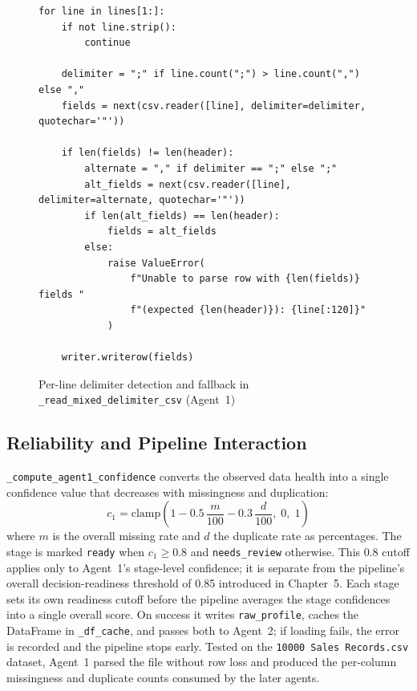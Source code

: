 \documentclass[12pt,a4paper,openany]{report}
\begin{document}
\begin{figure}[H]
\centering
\begin{lstlisting}[style=pystyle]
for line in lines[1:]:
    if not line.strip():
        continue

    delimiter = ";" if line.count(";") > line.count(",") else ","
    fields = next(csv.reader([line], delimiter=delimiter, quotechar='"'))

    if len(fields) != len(header):
        alternate = "," if delimiter == ";" else ";"
        alt_fields = next(csv.reader([line], delimiter=alternate, quotechar='"'))
        if len(alt_fields) == len(header):
            fields = alt_fields
        else:
            raise ValueError(
                f"Unable to parse row with {len(fields)} fields "
                f"(expected {len(header)}): {line[:120]}"
            )

    writer.writerow(fields)
\end{lstlisting}
\caption{Per-line delimiter detection and fallback in \texttt{\_read\_mixed\_delimiter\_csv} (Agent~1)}
\label{fig:code-agent1-csv}
\end{figure}

\subsection{Reliability and Pipeline Interaction}
\texttt{\_compute\_agent1\_confidence} converts the observed data health into a single confidence value that decreases with missingness and duplication:
\begin{equation}
c_1 = \text{clamp}\!\left(1 - 0.5\,\frac{m}{100} - 0.3\,\frac{d}{100},\; 0,\; 1\right)
\label{eq:agent1-conf}
\end{equation}
where $m$ is the overall missing rate and $d$ the duplicate rate as percentages. The stage is marked \texttt{ready} when $c_1 \geq 0.8$ and \texttt{needs\_review} otherwise. This 0.8 cutoff applies only to Agent~1's stage-level confidence; it is separate from the pipeline's overall decision-readiness threshold of 0.85 introduced in Chapter~5. Each stage sets its own readiness cutoff before the pipeline averages the stage confidences into a single overall score. On success it writes \texttt{raw\_profile}, caches the DataFrame in \texttt{\_df\_cache}, and passes both to Agent~2; if loading fails, the error is recorded and the pipeline stops early. Tested on the \texttt{10000 Sales Records.csv} dataset, Agent~1 parsed the file without row loss and produced the per-column missingness and duplicate counts consumed by the later agents.
\end{document}
